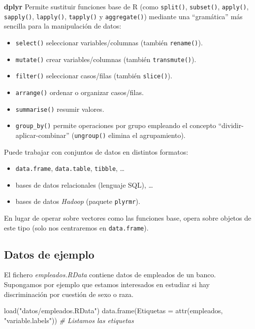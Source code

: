 \documentclass[
]{book}
\newenvironment{Shaded}{\begin{snugshade}}{\end{snugshade}}
\newcommand{\AttributeTok}[1]{\textcolor[rgb]{0.77,0.63,0.00}{#1}}
\newcommand{\CommentTok}[1]{\textcolor[rgb]{0.56,0.35,0.01}{\textit{#1}}}
\newcommand{\FunctionTok}[1]{\textcolor[rgb]{0.00,0.00,0.00}{#1}}
\newcommand{\NormalTok}[1]{#1}
\newcommand{\StringTok}[1]{\textcolor[rgb]{0.31,0.60,0.02}{#1}}
\providecommand{\tightlist}{%
  \setlength{\itemsep}{0pt}\setlength{\parskip}{0pt}}
\theoremstyle{break}
\begin{document}
\textbf{dplyr} Permite sustituir funciones base de R (como \texttt{split()}, \texttt{subset()},
\texttt{apply()}, \texttt{sapply()}, \texttt{lapply()}, \texttt{tapply()} y \texttt{aggregate()})
mediante una ``gramática'' más sencilla para la manipulación de datos:

\begin{itemize}
\tightlist
\item
  \texttt{select()} seleccionar variables/columnas (también \texttt{rename()}).
\item
  \texttt{mutate()} crear variables/columnas (también \texttt{transmute()}).
\item
  \texttt{filter()} seleccionar casos/filas (también \texttt{slice()}).
\item
  \texttt{arrange()} ordenar o organizar casos/filas.
\item
  \texttt{summarise()} resumir valores.
\item
  \texttt{group\_by()} permite operaciones por grupo empleando el concepto
  ``dividir-aplicar-combinar'' (\texttt{ungroup()} elimina el agrupamiento).
\end{itemize}

Puede trabajar con conjuntos de datos en distintos formatos:

\begin{itemize}
\tightlist
\item
  \texttt{data.frame}, \texttt{data.table}, \texttt{tibble}, \ldots{}
\item
  bases de datos relacionales (lenguaje SQL), \ldots{}
\item
  bases de datos \emph{Hadoop} (paquete \texttt{plyrmr}).
\end{itemize}

En lugar de operar sobre vectores como las funciones base,
opera sobre objetos de este tipo (solo nos centraremos en \texttt{data.frame}).

\hypertarget{datos-de-ejemplo-1}{%
\subsection{Datos de ejemplo}\label{datos-de-ejemplo-1}}

El fichero \emph{empleados.RData} contiene datos de empleados de un banco.
Supongamos por ejemplo que estamos interesados en estudiar si hay
discriminación por cuestión de sexo o raza.

\begin{Shaded}
\begin{Highlighting}[]
\FunctionTok{load}\NormalTok{(}\StringTok{"datos/empleados.RData"}\NormalTok{)}
\FunctionTok{data.frame}\NormalTok{(}\AttributeTok{Etiquetas =} \FunctionTok{attr}\NormalTok{(empleados, }\StringTok{"variable.labels"}\NormalTok{))  }\CommentTok{\# Listamos las etiquetas}
\end{Highlighting}
\end{Shaded}
\end{document}
